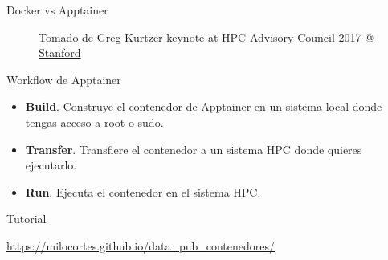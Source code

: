 \documentclass[11pt]{beamer}
\begin{document}
\begin{frame}{Docker vs Apptainer}

\begin{figure}%
    \centering
    \qquad
    \caption{Tomado de  \href{https://www.hpcadvisorycouncil.com/events/2017/stanford-workshop/pdf/GMKurtzer_Singularity_Keynote_Tuesday_02072017.pdf}{Greg Kurtzer keynote at HPC Advisory Council 2017 @ Stanford}}%
    \label{fig:example}%
\end{figure}

\end{frame}

\begin{frame}{Workflow de Apptainer}
	\begin{itemize}
		\item \textbf{Build}. Construye el contenedor de Apptainer en un sistema local donde tengas acceso a root o sudo.
		\item \textbf{Transfer}. Transfiere el contenedor a un sistema HPC donde quieres ejecutarlo.
		\item \textbf{Run}. Ejecuta el contenedor en el sistema HPC.
	\end{itemize}
\end{frame}


\begin{frame}{Tutorial}
	\begin{center}
		\url{https://milocortes.github.io/data_pub_contenedores/}
	\end{center}
\end{frame}
\end{document}
